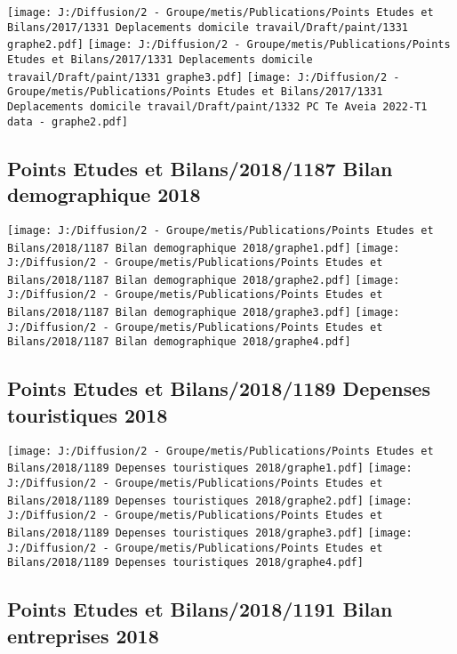\documentclass[
]{article}
\begin{document}
\texttt{[image: J:/Diffusion/2 - Groupe/metis/Publications/Points Etudes et Bilans/2017/1331 Deplacements domicile travail/Draft/paint/1331 graphe2.pdf]}
\texttt{[image: J:/Diffusion/2 - Groupe/metis/Publications/Points Etudes et Bilans/2017/1331 Deplacements domicile travail/Draft/paint/1331 graphe3.pdf]}
\texttt{[image: J:/Diffusion/2 - Groupe/metis/Publications/Points Etudes et Bilans/2017/1331 Deplacements domicile travail/Draft/paint/1332 PC Te Aveia 2022-T1 data - graphe2.pdf]}

\hypertarget{points-etudes-et-bilans20181187-bilan-demographique-2018}{%
\subsection{Points Etudes et Bilans/2018/1187 Bilan demographique
2018}\label{points-etudes-et-bilans20181187-bilan-demographique-2018}}

\texttt{[image: J:/Diffusion/2 - Groupe/metis/Publications/Points Etudes et Bilans/2018/1187 Bilan demographique 2018/graphe1.pdf]}
\texttt{[image: J:/Diffusion/2 - Groupe/metis/Publications/Points Etudes et Bilans/2018/1187 Bilan demographique 2018/graphe2.pdf]}
\texttt{[image: J:/Diffusion/2 - Groupe/metis/Publications/Points Etudes et Bilans/2018/1187 Bilan demographique 2018/graphe3.pdf]}
\texttt{[image: J:/Diffusion/2 - Groupe/metis/Publications/Points Etudes et Bilans/2018/1187 Bilan demographique 2018/graphe4.pdf]}

\hypertarget{points-etudes-et-bilans20181189-depenses-touristiques-2018}{%
\subsection{Points Etudes et Bilans/2018/1189 Depenses touristiques
2018}\label{points-etudes-et-bilans20181189-depenses-touristiques-2018}}

\texttt{[image: J:/Diffusion/2 - Groupe/metis/Publications/Points Etudes et Bilans/2018/1189 Depenses touristiques 2018/graphe1.pdf]}
\texttt{[image: J:/Diffusion/2 - Groupe/metis/Publications/Points Etudes et Bilans/2018/1189 Depenses touristiques 2018/graphe2.pdf]}
\texttt{[image: J:/Diffusion/2 - Groupe/metis/Publications/Points Etudes et Bilans/2018/1189 Depenses touristiques 2018/graphe3.pdf]}
\texttt{[image: J:/Diffusion/2 - Groupe/metis/Publications/Points Etudes et Bilans/2018/1189 Depenses touristiques 2018/graphe4.pdf]}

\hypertarget{points-etudes-et-bilans20181191-bilan-entreprises-2018}{%
\subsection{Points Etudes et Bilans/2018/1191 Bilan entreprises
2018}\label{points-etudes-et-bilans20181191-bilan-entreprises-2018}}
\end{document}
